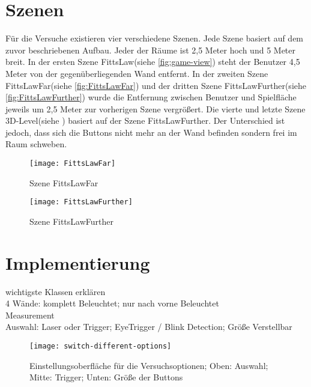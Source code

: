 \section{Szenen}
Für die Versuche existieren vier verschiedene Szenen. Jede Szene basiert auf dem zuvor beschriebenen Aufbau. Jeder der Räume ist 2,5 Meter hoch und 5 Meter breit. In der ersten Szene \glqq FittsLaw\grqq (siehe \autoref{fig:game-view}) steht der Benutzer 4,5 Meter von der gegenüberliegenden Wand entfernt. In der zweiten Szene \glqq FittsLawFar\grqq (siehe \autoref{fig:FittsLawFar}) und der dritten Szene \glqq FittsLawFurther\grqq (siehe \autoref{fig:FittsLawFurther}) wurde die Entfernung zwischen Benutzer und Spielfläche jeweils um 2,5 Meter zur vorherigen Szene vergrößert. Die vierte und letzte Szene \glqq 3D-Level\grqq (siehe ) basiert auf der Szene FittsLawFurther. Der Unterschied ist jedoch, dass sich die Buttons nicht mehr an der Wand befinden sondern frei im Raum schweben. 

\begin{figure}[!htbp]
	\centering
	\texttt{[image: FittsLawFar]}
	\caption[Szene FittsLawFar]{Szene FittsLawFar}
	\label{fig:FittsLawFar}
\end{figure}

\begin{figure}[!htbp]
	\centering
	\texttt{[image: FittsLawFurther]}
	\caption[Szene FittsLawFurther]{Szene FittsLawFurther}
	\label{fig:FittsLawFurther}
\end{figure}


\section{Implementierung}
wichtigste Klassen erklären \\

4 Wände: komplett Beleuchtet; nur nach vorne Beleuchtet \\

Measurement \\
Auswahl: Laser oder Trigger; EyeTrigger / Blink Detection; Größe Verstellbar \\

\begin{figure}[!htbp]
	\centering
	\texttt{[image: switch-different-options]}
	\caption[Einstellungsoberfläche für die Versuchsoptionen]{Einstellungsoberfläche für die Versuchsoptionen; Oben: Auswahl; Mitte: Trigger; Unten: Größe der Buttons}
	\label{fig:switch-different-options}
\end{figure}